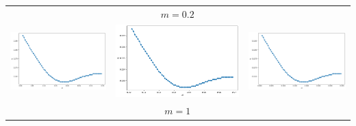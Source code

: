 \documentclass[a4paper,preprint,11pt]{article}
\begin{document}
\begin{table}[ht]
\begin{tabular}{ccc}
                        & $m=0.2$   &  \\
    \includegraphics[scale=0.2]{m1e005.png} & \includegraphics[scale=0.2]{m1e001.png} & \includegraphics[scale=0.2]{m1e0005.png}  \\
			& $m=1$   &  \\

\end{tabular}
\end{table}
\end{document}
